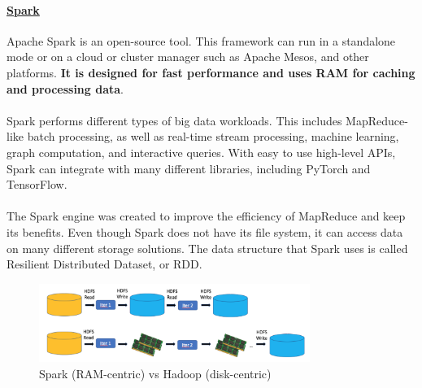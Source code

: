 \documentclass[10pt,a4paper]{article}
\newcommand{\nline}{\\~\\}
\begin{document}
\paragraph{\uline{Spark}}
Apache Spark is an open-source tool. This framework can run in a standalone mode or on a cloud or cluster manager such as Apache Mesos, and other platforms. \textbf{It is designed for fast performance and uses RAM for caching and processing data}.
\nline
Spark performs different types of big data workloads. This includes MapReduce-like batch processing, as well as real-time stream processing, machine learning, graph computation, and interactive queries. With easy to use high-level APIs, Spark can integrate with many different libraries, including PyTorch and TensorFlow.
\nline
The Spark engine was created to improve the efficiency of MapReduce and keep its benefits. Even though Spark does not have its file system, it can access data on many different storage solutions. The data structure that Spark uses is called Resilient Distributed Dataset, or RDD.
    \begin{figure}[ht!]
 \hfill \includegraphics[width=250pt]{images/spark-vs-hadoop}\hspace*{\fill}
 \caption{Spark (RAM-centric) vs Hadoop (disk-centric)}
 \end{figure} 
\end{document}
